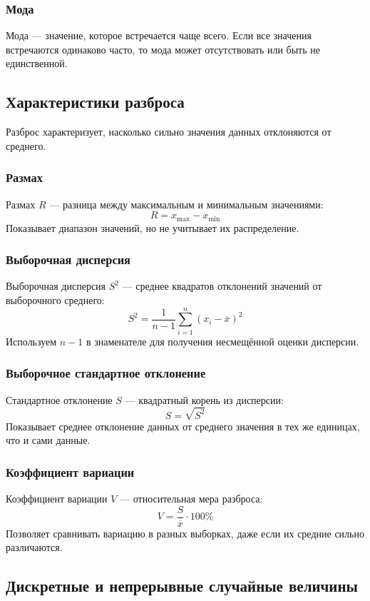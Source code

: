\subsubsection{Мода}
Мода — значение, которое встречается чаще всего.  
Если все значения встречаются одинаково часто, то мода может отсутствовать или быть не единственной.

\subsection{Характеристики разброса}
Разброс характеризует, насколько сильно значения данных отклоняются от среднего.

\subsubsection{Размах}
Размах $R$ — разница между максимальным и минимальным значениями:
\[
R = x_{\max} - x_{\min}
\]
Показывает диапазон значений, но не учитывает их распределение.

\subsubsection{Выборочная дисперсия}
Выборочная дисперсия $S^2$ — среднее квадратов отклонений значений от выборочного среднего:
\[
S^2 = \frac{1}{n-1} \sum_{i=1}^n (x_i - \overline{x})^2
\]
Используем $n-1$ в знаменателе для получения несмещённой оценки дисперсии.

\subsubsection{Выборочное стандартное отклонение}
Стандартное отклонение $S$ — квадратный корень из дисперсии:
\[
S = \sqrt{S^2}
\]
Показывает среднее отклонение данных от среднего значения в тех же единицах, что и сами данные.

\subsubsection{Коэффициент вариации}
Коэффициент вариации $V$ — относительная мера разброса:
\[
V = \frac{S}{\overline{x}} \cdot 100\%
\]
Позволяет сравнивать вариацию в разных выборках, даже если их средние сильно различаются.

\subsection{Дискретные и непрерывные случайные величины}
